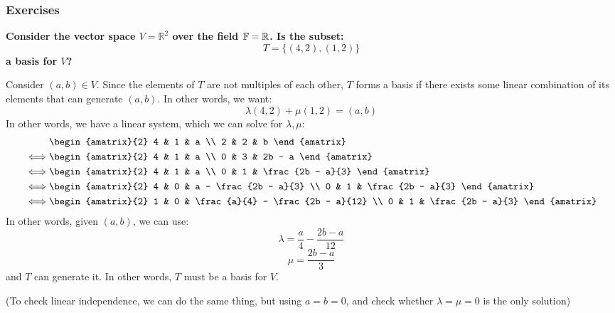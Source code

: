 \documentclass{exam}
\begin{document}
\subsubsection{Exercises}

\begin{questions}

\question \textbf{Consider the vector space $V = \mathbb{R}^2$ over the field $\mathbb{F} = \mathbb{R}$. Is the subset:}
\[
T = \{(4,2), (1,2)\}
\]
\textbf{a basis for $V$?}

\bigskip

Consider $(a,b) \in V$. Since the elements of $T$ are not multiples of each other, $T$ forms a basis if there exists some linear combination of its elements that can generate $(a,b)$. In other words, we want:
\[
\lambda(4,2) + \mu(1,2) = (a,b)
\]
In other words, we have a linear system, which we can solve for $\lambda, \mu$:
\begin{align*}
    &\begin{amatrix}{2}
        4 & 1 & a \\
        2 & 2 & b
    \end{amatrix} \\
    \iff &
    \begin{amatrix}{2}
        4 & 1 & a \\
        0 & 3 & 2b - a
    \end{amatrix} \\
    \iff &
    \begin{amatrix}{2}
        4 & 1 & a \\
        0 & 1 & \frac{2b - a}{3}
    \end{amatrix} \\
    \iff &
    \begin{amatrix}{2}
        4 & 0 & a - \frac{2b - a}{3} \\
        0 & 1 & \frac{2b - a}{3}
    \end{amatrix} \\
    \iff &
    \begin{amatrix}{2}
        1 & 0 & \frac{a}{4} - \frac{2b - a}{12} \\
        0 & 1 & \frac{2b - a}{3}
    \end{amatrix} 
\end{align*}
In other words, given $(a,b)$, we can use:
\[
\lambda = \frac{a}{4} - \frac{2b - a}{12}
\]
\[
\mu = \frac{2b - a}{3}
\]
and $T$ can generate it. In other words, $T$ must be a basis for $V$.

(To check linear independence, we can do the same thing, but using $a = b = 0$, and check whether $\lambda = \mu = 0$ is the only solution)

\end{questions}
\end{document}
